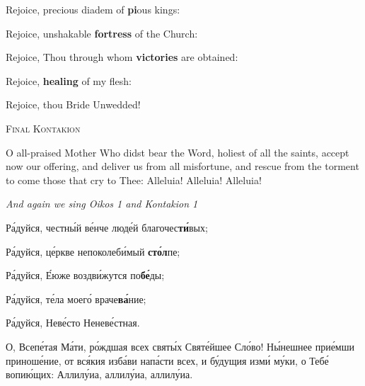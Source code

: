 \pagebreak



Rejoice, precious diadem of \textbf{pi}ous kings:


Rejoice, unshakable \textbf{fortress} of the Church:


Rejoice, Thou through whom \textbf{victories} are obtained:


Rejoice, \textbf{healing} of my flesh:


Rejoice, thou Bride Unwedded!

\begin{center}
  {\textsc{\color{Maroon}Final Kontakion}}
\end{center}

\Priest O all-praised Mother Who didst bear the Word, holiest of all the saints, accept now our offering, and deliver us from all misfortune, and rescue from the torment to come those that cry to Thee: Alleluia! Alleluia! Alleluia! \Thrice

\begin{center}
  {\color{Maroon}\emph{And again we sing Oikos 1 and Kontakion 1 }}
\end{center}

\pagebreak

\begin{russian}

  Ра́дуйся, честны́й ве́нче люде́й благочес\textbf{ти́}вых;


  Ра́дуйся, це́ркве непоколеби́мый \textbf{сто́л}пе;


  Ра́дуйся, Е́юже воздви́жутся по\textbf{бе́}ды;


  Ра́дуйся, те́ла моего́ враче\textbf{ва́}ние;


  Ра́дуйся, Неве́сто Неневе́стная.


  О, Всепе́тая Ма́ти, ро́ждшая всех святы́х Святе́йшее Сло́во! Ны́нешнее прие́мши приноше́ние, от вся́кия изба́ви напа́сти всех, и бу́дущия изми́ му́ки, о Тебе́ вопию́щих: Аллилу́иа, аллилу́иа, аллилу́иа. \Trizhdy

\end{russian}

